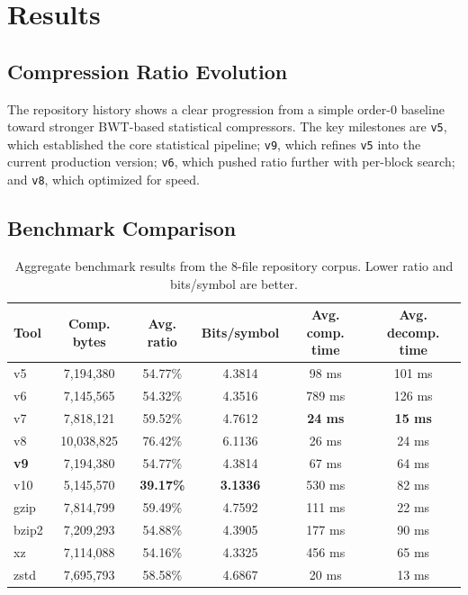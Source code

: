 \section{Results}
\label{sec:results}

\subsection{Compression Ratio Evolution}
The repository history shows a clear progression from a simple order-0 baseline toward stronger BWT-based statistical compressors. The key milestones are \texttt{v5}, which established the core statistical pipeline; \texttt{v9}, which refines \texttt{v5} into the current production version; \texttt{v6}, which pushed ratio further with per-block search; and \texttt{v8}, which optimized for speed.

\subsection{Benchmark Comparison}
\begin{table}[htbp]
\caption{Aggregate benchmark results from the 8-file repository corpus. Lower ratio and bits/symbol are better.}
\centering
\scriptsize
\begin{tabular}{lccccc}
\toprule
Tool & Comp. bytes & Avg. ratio & Bits/symbol & Avg. comp. time & Avg. decomp. time \\
\midrule
v5 & 7,194,380 & 54.77\% & 4.3814 & 98 ms & 101 ms \\
v6 & 7,145,565 & 54.32\% & 4.3516 & 789 ms & 126 ms \\
v7 & 7,818,121 & 59.52\% & 4.7612 & \textbf{24 ms} & \textbf{15 ms} \\
v8 & 10,038,825 & 76.42\% & 6.1136 & 26 ms & 24 ms \\
\textbf{v9} & 7,194,380 & 54.77\% & 4.3814 & 67 ms & 64 ms \\
v10 & 5,145,570 & \textbf{39.17\%} & \textbf{3.1336} & 530 ms & 82 ms \\
gzip & 7,814,799 & 59.49\% & 4.7592 & 111 ms & 22 ms \\
bzip2 & 7,209,293 & 54.88\% & 4.3905 & 177 ms & 90 ms \\
xz & 7,114,088 & 54.16\% & 4.3325 & 456 ms & 65 ms \\
zstd & 7,695,793 & 58.58\% & 4.6867 & 20 ms & 13 ms \\
\bottomrule
\end{tabular}
\label{tab:compression_comparison}
\end{table}

